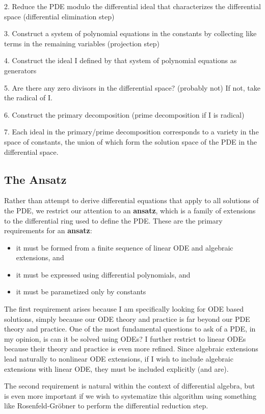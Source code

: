 \documentclass{article}
\begin{document}
2. Reduce the PDE modulo the differential ideal that characterizes the differential space (differential elimination step)

3. Construct a system of polynomial equations in the constants by collecting like terms in the remaining variables (projection step)

4. Construct the ideal I defined by that system of polynomial equations as generators

5. Are there any zero divisors in the differential space? (probably not)  If not, take the radical of I.

6. Construct the primary decomposition (prime decomposition if I is radical)

7. Each ideal in the primary/prime decomposition corresponds to a variety in the space of constants,
the union of which form the solution space of the PDE in the differential space.

\subsection*{The Ansatz}

Rather than attempt to derive differential equations that apply to all solutions
of the PDE, we restrict our attention to an {\bf ansatz}, which is a family of extensions
to the differential ring used to define the PDE.  These are the primary requirements
for an {\bf ansatz}:

\begin{itemize}
\item it must be formed from a finite sequence of linear ODE and algebraic extensions, and
\item it must be expressed using differential polynomials, and
\item it must be parametized only by constants
\end{itemize}

The first requirement arises because I am specifically looking for ODE based solutions,
simply because our ODE theory and practice is far beyond our PDE theory and practice.
One of the most fundamental questions to ask of a PDE, in my opinion, is can it
be solved using ODEs?  I further restrict to linear ODEs because their theory
and practice is even more refined.  Since algebraic extensions lead naturally
to nonlinear ODE extensions, if I wish to include algebraic extensions with
linear ODE, they must be included explicitly (and are).

The second requirement is natural within the context of differential algebra,
but is even more important if we wish to systematize this algorithm using
something like Rosenfeld-Gr\"obner to perform the differential reduction step.
\end{document}

